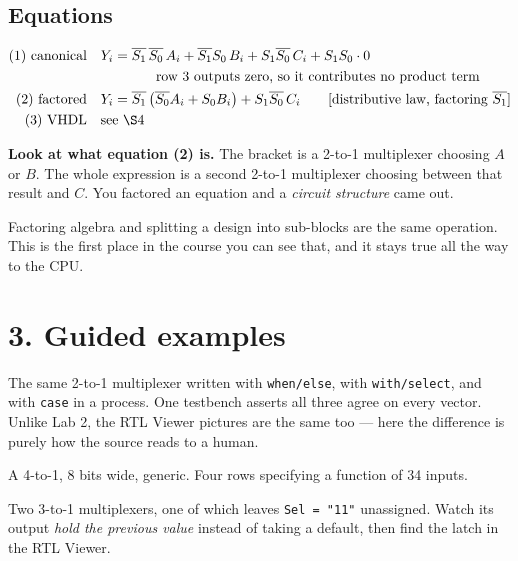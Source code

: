 \documentclass[11pt]{article}
\newcommand{\code}[1]{\texttt{#1}}
\begin{document}
\subsection*{Equations}

\begin{align*}
\text{(1) canonical} \quad & Y_i = \overline{S_1}\,\overline{S_0}\,A_i + \overline{S_1}S_0\,B_i + S_1\overline{S_0}\,C_i + S_1S_0\cdot 0\\
& \qquad\qquad \text{row 3 outputs zero, so it contributes no product term}\\
\text{(2) factored} \quad & Y_i = \overline{S_1}\left( \overline{S_0}A_i + S_0 B_i \right) + S_1\overline{S_0}\,C_i
  \qquad \text{[distributive law, factoring $\overline{S_1}$]}\\
\text{(3) VHDL} \quad & \text{see \S4}
\end{align*}

\textbf{Look at what equation (2) is.} The bracket is a 2-to-1 multiplexer
choosing $A$ or $B$. The whole expression is a second 2-to-1 multiplexer choosing
between that result and $C$. You factored an equation and a \emph{circuit
structure} came out.

Factoring algebra and splitting a design into sub-blocks are the same operation.
This is the first place in the course you can see that, and it stays true all the
way to the CPU.

\section*{3. Guided examples}

\begin{description}[leftmargin=2.4em,style=nextline,itemsep=2pt]
\item[Example 1 --- three styles] The same 2-to-1 multiplexer written with
\code{when/else}, with \code{with/select}, and with \code{case} in a process.
One testbench asserts all three agree on every vector. Unlike Lab 2, the RTL
Viewer pictures are the same too --- here the difference is purely how the source
reads to a human.
\item[Example 2 --- \code{mux4}] A 4-to-1, 8 bits wide, generic. Four rows
specifying a function of 34 inputs.
\item[Example 3 --- the latch trap] Two 3-to-1 multiplexers, one of which leaves
\code{Sel = "11"} unassigned. Watch its output \emph{hold the previous value}
instead of taking a default, then find the latch in the RTL Viewer.
\end{description}
\end{document}
